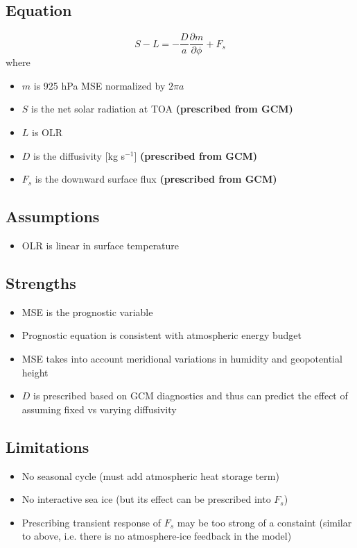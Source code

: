 \documentclass{article}
\begin{document}
\subsection{Equation}
\begin{equation}
    S - L = -\frac{D}{a}\frac{\partial m}{\partial \phi} + F_s
\end{equation}
where
\begin{itemize}
    \item $m$ is 925 hPa MSE normalized by $2\pi a$
    \item $S$ is the net solar radiation at TOA \textbf{(prescribed from GCM)}
    \item $L$ is OLR
    \item $D$ is the diffusivity [kg s$^{-1}$] \textbf{(prescribed from GCM)}
    \item $F_s$ is the downward surface flux \textbf{(prescribed from GCM)}
\end{itemize}

\subsection{Assumptions}
\begin{itemize}
    \item OLR is linear in surface temperature
\end{itemize}

\subsection{Strengths}
\begin{itemize}
    \item MSE is the prognostic variable
    \item Prognostic equation is consistent with atmospheric energy budget
    \item MSE takes into account meridional variations in humidity and geopotential height
    \item $D$ is prescribed based on GCM diagnostics and thus can predict the effect of assuming fixed vs varying diffusivity
\end{itemize}

\subsection{Limitations}
\begin{itemize}
    \item No seasonal cycle (must add atmospheric heat storage term)
    \item No interactive sea ice (but its effect can be prescribed into $F_s$)
    \item Prescribing transient response of $F_s$ may be too strong of a constaint (similar to above, i.e. there is no atmosphere-ice feedback in the model)
\end{itemize}
\end{document}
